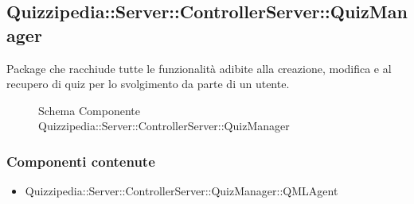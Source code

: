 \subsection{Quizzipedia::Server::ControllerServer::QuizManager}
Package che racchiude tutte le funzionalità adibite alla creazione, modifica e al recupero di quiz per lo svolgimento da parte di un utente.
\begin{figure}[H]
\centering
\noindent{}
\caption[Quizzipedia::Server::ControllerServer::QuizManager]{Schema Componente Quizzipedia::Server::ControllerServer::QuizManager}
\end{figure}
\subsubsection{Componenti contenute}
\begin{itemize}
\item Quizzipedia::Server::ControllerServer::QuizManager::QMLAgent
\end{itemize}

